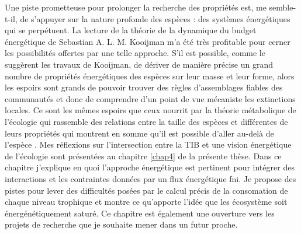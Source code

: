 Une piste prometteuse pour prolonger la recherche des propriétés est, me
semble-t-il, de s'appuyer sur la nature profonde des espèces : des
systèmes énergétiques qui se perpétuent. La lecture de la théorie de la
dynamique du budget énergétique de Sebastian A. L. M. Kooijman
\citep{Kooijman2000a} m'a été très profitable pour cerner les
possibilités offertes par une telle approche. S'il est possible, comme
le suggèrent les travaux de Kooijman, de dériver de manière précise un
grand nombre de propriétés énergétiques des espèces sur leur masse et
leur forme, alors les espoirs sont grands de pouvoir trouver des règles
d'assemblages fiables des communautés et donc de comprendre d'un point
de vue mécaniste les extinctions locales. Ce sont les mêmes espoirs que
ceux nourrit par la théorie métabolique de l'écologie qui rassemble des
relations entre la taille des espèces et différentes de leurs propriétés
\citep{Brown2004} qui montrent en somme qu'il est possible d'aller
au-delà de l'espèce \citep{Poisot2015}. Mes réflexions sur
l'intersection entre la TIB et une vision énergétique de l'écologie sont
présentées au chapitre \ref{chap4} de la présente thèse. Dans ce
chapitre j'explique en quoi l'approche énergétique est pertinent pour
intégrer des interactions et les contraintes données par un flux
énergétique fni. Je propose des pistes pour lever des difficultés posées
par le calcul précis de la consomation de chaque niveau trophique et
montre ce qu'apporte l'idée que les écosystème soit énergénétiquement
saturé. Ce chapitre est également une ouverture vers les projets de
recherche que je souhaite mener dans un futur proche.
